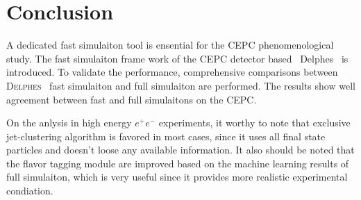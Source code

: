 \documentclass[a4paper,10pt,twoside]{cpc-hepnp}
\begin{document}
\section{Conclusion\label{sec:conclusion}}
A dedicated fast simulaiton tool is ensential for the CEPC phenomenological study.
The fast simulaiton  frame work of the CEPC detector based {~\textsf{Delphes}~} is introduced. 
To validate the performance, comprehensive comparisons between {\textsc{Delphes}~} fast simulaiton and full simulaiton are performed.
The results show  well agreement between fast and full simulaitons on the CEPC.

On the anlysis in high energy $e^+e^-$ experiments, it worthy to note that exclusive jet-clustering algorithm is favored in most cases,
since it uses all final state particles and doesn't loose any available information. 
It also should be noted that the flavor tagging module are improved based on the machine learning results of full simulaiton, 
which is very useful since it provides more realistic experimental condiation.
\vspace{3mm}
\end{document}
